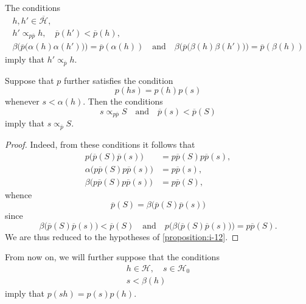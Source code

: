 \documentclass[a4paper,fleqn]{article}
\theoremstyle{plain}
\newenvironment{corollary}[1]
  {\renewcommand\theinnercorollary{#1}\innercorollary}
  {\endinnercorollary}
\theoremstyle{definition}
\newcommand{\oldpage}[1]{{\marginpar{\footnotesize$\bigg\vert$\,\,\,\,\textit{p.~#1}}}}
\newcommand{\textand}{\quad\text{and}\quad}
\newcommand{\HH}{\mathcal{H}}
\newcommand{\bHH}{\overline{\HH}}
\newcommand{\subs}{\mathrel{\propto}}
\begin{document}
\begin{corollary}{1}
  \oldpage{374}
  The conditions
  \[
    \begin{gathered}
      h,h'\in\bHH,
    \\h'\subs_{p\overline{p}}h,
      \quad \overline{p}(h') < \overline{p}(h),
    \\\beta\big(
        \overline{p}\big(\alpha(h)\alpha(h')\big)
      \big) = \overline{p}(\alpha(h))
      \textand
      \beta\big(
        \overline{p}\big(\beta(h)\beta(h')\big)
      \big) = \overline{p}(\beta(h))
    \end{gathered}
  \]
  imply that $h'\subs_{\overline{p}}h$.
\end{corollary}

\begin{corollary}{2}
  Suppose that $p$ further satisfies the condition
  \[
    p(hs)
    = p(h)p(s)
  \]
  whenever $s<\alpha(h)$.
  Then the conditions
  \[
    s\subs_{p\overline{p}}S
    \textand
    \overline{p}(s) < \overline{p}(S)
  \]
  imply that $s\subs_{\overline{p}}S$.
\end{corollary}

\begin{proof}
  Indeed, from these conditions it follows that
  \[
    \begin{aligned}
      p\big(
        \overline{p}(S)\overline{p}(s)
      \big)
      &= p\overline{p}(S)p\overline{p}(s),
    \\\alpha\big(
        p\overline{p}(S)p\overline{p}(s)
      \big)
      &= p\overline{p}(s),
    \\\beta\big(
        p\overline{p}(S)p\overline{p}(s)
      \big)
      &= p\overline{p}(S),
    \end{aligned}
  \]
  whence
  \[
    \overline{p}(S)
    = \beta\big(
      \overline{p}(S)\overline{p}(s)
    \big)
  \]
  since
  \[
    \beta\big(
      \overline{p}(S)\overline{p}(s)
    \big) < \overline{p}(S)
    \textand
    p\big(
      \beta\big(
        \overline{p}(S)\overline{p}(s)
      \big)
    \big) = p\overline{p}(S).
  \]
  We are thus reduced to the hypotheses of \cref{proposition:i-12}.
\end{proof}

From now on, we will further suppose that the conditions
\[
  \begin{gathered}
    h\in\HH,
    \quad s\in\HH_0
  \\s < \beta(h)
  \end{gathered}
\]
imply that $p(sh)=p(s)p(h)$.
\end{document}
